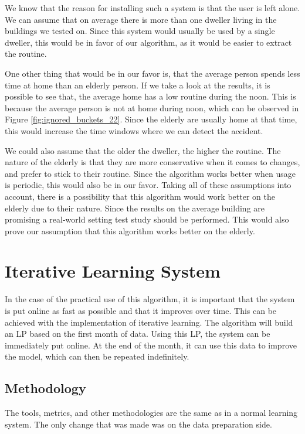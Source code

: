 We know that the reason for installing such a system is that the user is left alone.
We can assume that on average there is more than one dweller living in the buildings we tested on.
Since this system would usually be used by a single dweller,
this would be in favor of our algorithm, as it would be easier to extract the routine.

One other thing that would be in our favor is, that the average person spends less time at home than an elderly person. 
If we take a look at the results, it is possible to see that, the average home has a low routine during the noon. 
This is because the average person is not at home during noon, which can be observed in Figure \ref{fig:ignored_buckets_22}.
Since the elderly are usually home at that time, this would increase the time windows where we can detect the accident.

We could also assume that the older the dweller, the higher the routine. 
The nature of the elderly is that they are more conservative when it comes to changes, and prefer to stick to their routine.
Since the algorithm works better when usage is periodic, this would also be in our favor. 
Taking all of these assumptions into account, there is a possibility that this algorithm would work better on the elderly due to their nature.
Since the results on the average building are promising a real-world setting test study should be performed. 
This would also prove our assumption that this algorithm works better on the elderly.

\section{Iterative Learning System}
\label{sec:iter_learning_system}
In the case of the practical use of this algorithm, it is important that the system is put online as fast as possible and that it improves over time.
This can be achieved with the implementation of iterative learning.
The algorithm will build an LP based on the first month of data.
Using this LP, the system can be immediately put online.
At the end of the month, it can use this data to improve the model, which can then be repeated indefinitely.

\subsection{Methodology}
The tools, metrics, and other methodologies are the same as in a normal learning system.
The only change that was made was on the data preparation side.

